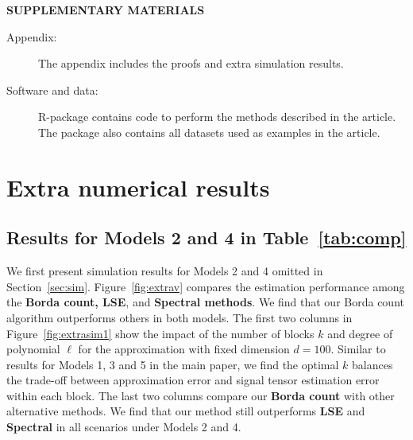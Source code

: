 \documentclass[12pt]{article}
\theoremstyle{definition}
\begin{document}



\clearpage
\bigskip
\begin{center}
{\large\bf SUPPLEMENTARY MATERIALS}
\end{center}

\begin{description}

\item[Appendix:] The appendix includes the proofs and extra simulation results. 

\item[Software and data:] R-package contains code to perform the methods described in the article. The package also contains all datasets used as examples in the article.
\end{description}

\appendix


\renewcommand{\thefigure}{S\arabic{figure}}
\setcounter{figure}{0}   
\renewcommand{\thetable}{S\arabic{table}}
\setcounter{table}{0}   

\section{Extra numerical results}
\subsection{Results for Models 2 and 4 in Table~\ref{tab:comp}}\label{sec:extra}
We first present simulation results for Models 2 and 4 omitted in Section~\ref{sec:sim}. Figure~\ref{fig:extrav} compares the estimation performance among the {\bf \small Borda count, LSE}, and {\bf \small Spectral methods}. We find that our Borda count algorithm outperforms others in both models. The first two columns in Figure~\ref{fig:extrasim1} show the impact of the number of blocks $k$ and degree of polynomial $\ell$ for the approximation with fixed dimension $d = 100$. Similar to results for Models 1, 3 and 5 in the main paper, we find the optimal $k$ balances the trade-off between approximation error and signal tensor estimation error within each block. The last two columns compare our {\bf \small Borda count} with other alternative methods. We find that our method still outperforms {\bf \small LSE} and {\bf \small Spectral} in all scenarios under Models 2 and 4.
\end{document}
